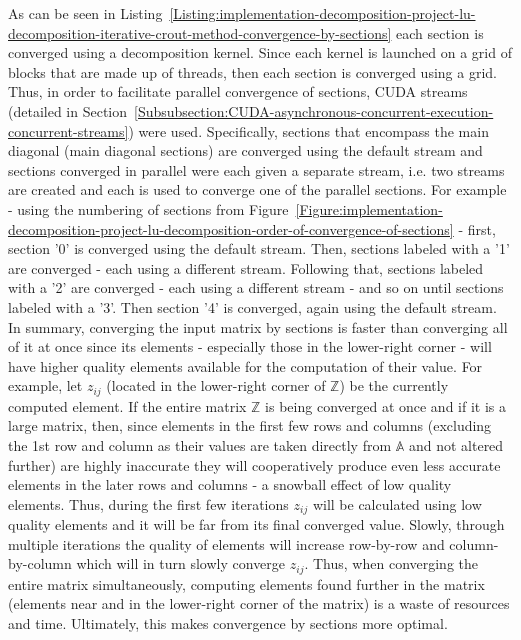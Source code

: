 As can be seen in Listing~\ref{Listing:implementation-decomposition-project-lu-decomposition-iterative-crout-method-convergence-by-sections} each section is converged using a decomposition kernel. Since each kernel is launched on a grid of blocks that are made up of threads, then each section is converged using a grid. Thus, in order to facilitate parallel convergence of sections, CUDA streams (detailed in Section~\ref{Subsubsection:CUDA-asynchronous-concurrent-execution-concurrent-streams}) were used. Specifically, sections that encompass the main diagonal (main diagonal sections) are converged using the default stream and sections converged in parallel were each given a separate stream, i.e. two streams are created and each is used to converge one of the parallel sections. For example - using the numbering of sections from Figure~\ref{Figure:implementation-decomposition-project-lu-decomposition-order-of-convergence-of-sections} - first, section '0' is converged using the default stream. Then, sections labeled with a '1' are converged - each using a different stream. Following that, sections labeled with a '2' are converged - each using a different stream - and so on until sections labeled with a '3'. Then section '4' is converged, again using the default stream. \\
In summary, converging the input matrix by sections is faster than converging all of it at once since its elements - especially those in the lower-right corner - will have higher quality elements available for the computation of their value. For example, let $ z_{ij} $ (located in the lower-right corner of $ \mathbb{Z} $) be the currently computed element. If the entire matrix $ \mathbb{Z} $ is being converged at once and if it is a large matrix, then, since elements in the first few rows and columns (excluding the 1st row and column as their values are taken directly from $ \mathbb{A} $ and not altered further) are highly inaccurate they will cooperatively produce even less accurate elements in the later rows and columns - a snowball effect of low quality elements. Thus, during the first few iterations $ z_{ij} $ will be calculated using low quality elements and it will be far from its final converged value. Slowly, through multiple iterations the quality of elements will increase row-by-row and column-by-column which will in turn slowly converge $ z_{ij} $. Thus, when converging the entire matrix simultaneously, computing elements found further in the matrix (elements near and in the lower-right corner of the matrix) is a waste of resources and time. Ultimately, this makes convergence by sections more optimal.

